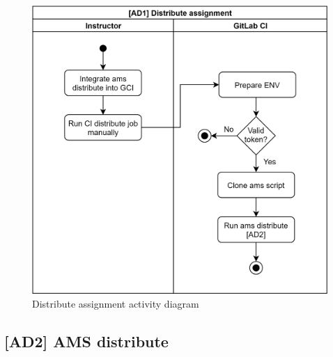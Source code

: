 \begin{figure}[H]
    \centering
    \includegraphics[width=\textwidth,height=\textheight,keepaspectratio]{Figures/ad/ad4.png}
    \caption{Distribute assignment activity diagram}
\end{figure}

\subsection{{[}AD2{]} AMS distribute} \label{ssec:ad2}

